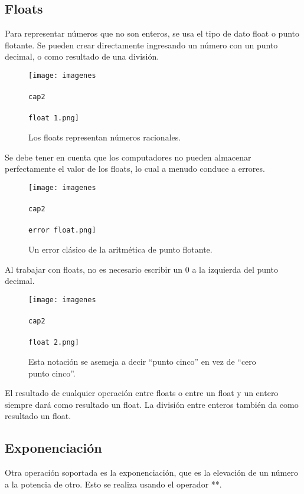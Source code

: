 \documentclass{article}
\newcommand{\doble}[1]{``#1''}
\begin{document}
    \subsection{Floats}
      Para representar números que no son enteros, se usa el tipo de dato float o punto flotante. Se pueden crear directamente ingresando un número con un punto decimal, o como resultado de una división.

      \begin{figure}[ht!]
        \texttt{[image: imagenes\\\\cap2\\\\float 1.png]}
        \caption{Los floats representan números racionales.}
      \end{figure}

      Se debe tener en cuenta que los computadores no pueden almacenar perfectamente el valor de los floats, lo cual a menudo conduce a errores.

      \begin{figure}[ht!]
        \texttt{[image: imagenes\\\\cap2\\\\error float.png]}
        \caption{Un error clásico de la aritmética de punto flotante.}
      \end{figure}

      Al trabajar con floats, no es necesario escribir un 0 a la izquierda del punto decimal.

      \begin{figure}[ht!]
        \texttt{[image: imagenes\\\\cap2\\\\float 2.png]}
        \caption{Esta notación se asemeja a decir \doble{punto cinco} en vez de \doble{cero punto cinco}.}
      \end{figure}

      El resultado de cualquier operación entre floats o entre un float y un entero siempre dará como resultado un float. La división entre enteros también da como resultado un float.


      \subsection{Exponenciación}

      Otra operación soportada es la exponenciación, que es la elevación de un número a la potencia de otro. Esto se realiza usando el operador **.
\end{document}
